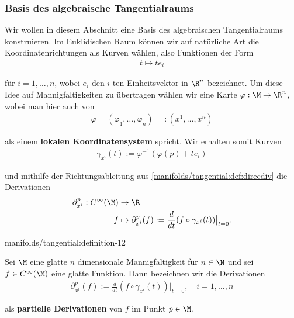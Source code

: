 \documentclass[letterpaper,10pt,german]{jupyterBook}
\begin{document}
\subsubsection{Basis des algebraische Tangentialraums}
\label{\detokenize{manifolds/tangential:basis-des-algebraische-tangentialraums}}\label{\detokenize{manifolds/tangential:sec-tpbasis}}
\par
Wir wollen in diesem Abschnitt eine Basis des algebraischen Tangentialraums konstruieren.
Im Euklidischen Raum können wir auf natürliche Art die Koordinatenrichtungen als Kurven wählen, also Funktionen der Form
\begin{align*}
t \mapsto t e_i
\end{align*}
\par
für \(i=1,\ldots,n\), wobei \(e_i\) den \(i\) ten Einheitsvektor in \(\R^n\) bezeichnet.
Um diese Idee auf Mannigfaltigkeiten zu übertragen wählen wir eine Karte \(\varphi:\M\to\R^n\), wobei man hier auch von
\begin{align*}
\varphi = (\varphi_1,\ldots,\varphi_n) =: (x^1,\ldots,x^n)
\end{align*}
\par
als einem \textbf{lokalen Koordinatensystem} spricht.
Wir erhalten somit Kurven
\begin{align*}
\gamma_{x^i}(t):= \varphi^{-1}(\varphi(p) + t e_i)
\end{align*}
\par
und mithilfe der Richtungsableitung aus \cref{manifolds/tangential:def:direcdiv} die Derivationen
\begin{align*}
\partial_{x^i}^p: C^\infty(\M) &\to \R\\
f &\mapsto \partial_{x^i}^p(f) := \frac{d}{dt} (f\circ \gamma_{x^i}(t))\big\rvert_{t=0}.
\end{align*}\begin{definition}{}{manifolds/tangential:definition-12}



\par
Sei \(\M\) eine glatte \(n\) dimensionale Mannigfaltigkeit für \(n\in\N\) und sei \(f \in C^\infty(\M)\) eine glatte Funktion.
Dann bezeichnen wir die Derivationen
\begin{align*}
\partial_{x^i}^p (f) := \frac{d}{dt} (f\circ \gamma_{x^i}(t))\big\rvert_{t=0}, \quad i=1,\ldots,n
\end{align*}
\par
als \textbf{partielle Derivationen} von \(f\) im Punkt \(p \in \M\).
\end{definition}
\end{document}
